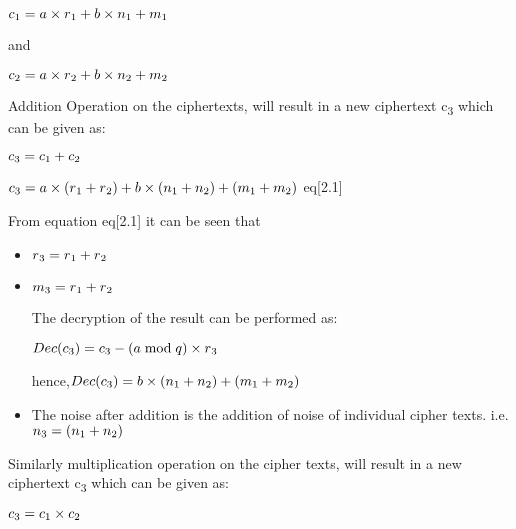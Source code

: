 \begin{itemize}
 \noindent\hspace{3cm} $c\textsubscript{1}=a\times r\textsubscript{1}+b\times n\textsubscript{1}  +m\textsubscript{1}$
 
 and 
 
 \noindent\hspace{3cm}$c\textsubscript{2}=a\times r\textsubscript{2}+b\times n\textsubscript{2}  +m\textsubscript{2}$
 
 \noindent Addition Operation on the ciphertexts, will result in a new ciphertext c\textsubscript{3} which can be given as:

 \noindent\hspace{3cm} $c\textsubscript{3}=c\textsubscript{1}+c\textsubscript{2}$
 
 \noindent\hspace{3cm} $c\textsubscript{3}=a\times (r\textsubscript{1}+r\textsubscript{2})+b\times (n\textsubscript{1}+n\textsubscript{2}) +(m\textsubscript{1}+m\textsubscript{2})$  \hfill                                                                   eq[2.1]

 \noindent From equation eq[2.1] it can be seen that 
\begin{itemize}
\item
 \noindent $r\textsubscript{3}=r\textsubscript{1}+r\textsubscript{2}$
\item
 \noindent $m\textsubscript{3}= r\textsubscript{1}+ r\textsubscript{2}$

\vspace{0.25cm}
 \noindent The decryption of the result can be performed as:

 \noindent\hspace{3cm} $Dec(c\textsubscript{3})=c\textsubscript{3}-(a\bmod q)\times r\textsubscript{3}$
 
 \noindent hence,\hspace{2cm}$Dec(c\textsubscript{3})=b\times (n\textsubscript{1}+n\textsubscript{2}) +(m\textsubscript{1}+m\textsubscript{2})$
\item
The noise after addition is the  addition of noise of individual cipher texts. i.e. 
$n\textsubscript{3}=(n\textsubscript{1}+n\textsubscript{2})$
\end{itemize}

 \noindent Similarly multiplication operation on the cipher texts, will result in a new ciphertext c\textsubscript{3} which can be given as:
 
$c\textsubscript{3}=c\textsubscript{1}\times c\textsubscript{2}$


\end{itemize}
